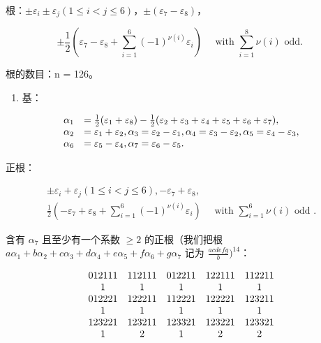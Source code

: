 根：\(\pm \varepsilon_{i} \pm \varepsilon_{j} (1 \leqslant i < j \leqslant 6)\)，\(\pm (\varepsilon_{7} - \varepsilon_{8})\)，

\[
\pm \frac {1}{2} (\varepsilon_ {7} - \varepsilon_ {8} + \sum_ {i = 1} ^ {6} (- 1) ^ {\nu (i)} \varepsilon_ {i}) \quad \text { with } \sum_ {i = 1} ^ {8} \nu (i) \text { odd. }
\]

根的数目：n = 126。

\begin{enumerate}
\def\labelenumi{(\Roman{enumi})}
\setcounter{enumi}{1}
\tightlist
\item
  基：
\end{enumerate}

\[
\begin{array}{r l} \alpha_ {1} & = \frac {1}{2} (\varepsilon_ {1} + \varepsilon_ {8}) - \frac {1}{2} (\varepsilon_ {2} + \varepsilon_ {3} + \varepsilon_ {4} + \varepsilon_ {5} + \varepsilon_ {6} + \varepsilon_ {7}), \\ \alpha_ {2} & = \varepsilon_ {1} + \varepsilon_ {2}, \alpha_ {3} = \varepsilon_ {2} - \varepsilon_ {1}, \alpha_ {4} = \varepsilon_ {3} - \varepsilon_ {2}, \alpha_ {5} = \varepsilon_ {4} - \varepsilon_ {3}, \\ \alpha_ {6} & = \varepsilon_ {5} - \varepsilon_ {4}, \alpha_ {7} = \varepsilon_ {6} - \varepsilon_ {5}. \end{array}
\]

正根：

\[
\begin{array}{c} \pm \varepsilon_ {i} + \varepsilon_ {j} (1 \leqslant i <   j \leqslant 6), - \varepsilon_ {7} + \varepsilon_ {8}, \\ \frac {1}{2} (- \varepsilon_ {7} + \varepsilon_ {8} + \sum_ {i = 1} ^ {6} (- 1) ^ {\nu (i)} \varepsilon_ {i}) \quad \text { with } \sum_ {i = 1} ^ {6} \nu (i) \text { odd }. \end{array}
\]

含有 \(\alpha_{7}\) 且至少有一个系数 \(\geqslant 2\) 的正根（我们把根 \(a\alpha_{1} + b\alpha_{2} + c\alpha_{3} + d\alpha_{4} + e\alpha_{5} + f\alpha_{6} + g\alpha_{7}\) 记为 \(\frac{a c d e f g}{b})^{14}\)：

\[
\begin{array}{c c c c c} 0   1   2   1   1   1 & 1   1   2   1   1   1 & 0   1   2   2   1   1 & 1   2   2   1   1   1 & 1   1   2   2   1   1 \\ 1 & 1 & 1 & 1 & 1 \\ 0   1   2   2   2   1 & 1   2   2   2   1   1 & 1   1   2   2   2   1 & 1   2   2   2   2   1 & 1   2   3   2   1   1 \\ 1 & 1 & 1 & 1 & 1 \\ 1   2   3   2   2   1 & 1   2   3   2   1   1 & 1   2   3   3   2   1 & 1   2   3   2   2   1 & 1   2   3   3   2   1 \\ 1 & 2 & 1 & 2 & 2 \end{array}
\]

